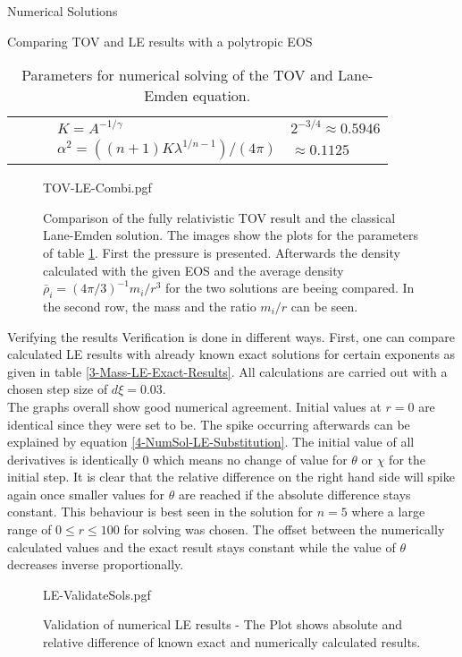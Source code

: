 \begin{section}{Numerical Solutions}
\begin{subsection}{Comparing TOV and LE results with a polytropic EOS}
\begin{table}[H]
\begin{tabular}{@{}llcll@{}}
		&&& $K=A^{-1/\gamma}$ & $2^{-3/4}\approx0.5946$\\
		&&& $\alpha^2=((n+1)K\lambda^{1/n-1})/(4\pi)$ & $\approx0.1125$\\
		\bottomrule
	\end{tabular}
	\caption[Numerical Parameters for TOV and Lane-Emden equation]{Parameters for numerical solving of the TOV and Lane-Emden equation.}
	\label{4-NumSol-TOVParameters}
\end{table}%
\begin{figure}[H]
	\centering
	{TOV-LE-Combi.pgf}
	\caption[Comparison TOV and LE equation]{Comparison of the fully relativistic TOV result and the classical Lane-Emden solution. The images show the plots for the parameters of table \ref{4-NumSol-TOVParameters}. First the pressure is presented. Afterwards the density calculated with the given EOS and the average density $\bar{\rho}_i=(4\pi/3)^{-1}m_i/r^3$ for the two solutions are beeing compared. In the second row, the mass and the ratio $m_i/r$ can be seen.}
	\label{4-NumSol-TOVEqEasyEOS}
\end{figure}
\end{subsection}
%
%
\begin{subsection}{Verifying the results}
\label{4-NumSol-Sec-Verifiying-the-results}
Verification is done in different ways. First, one can compare calculated LE results with already known exact  solutions for certain exponents as given in table \ref{3-Mass-LE-Exact-Results}. All calculations are carried out with a chosen step size of $d\xi=0.03$.\\
The graphs overall show good numerical agreement. Initial values at $r=0$ are identical since they were set to be. The spike occurring afterwards can be explained by equation \ref{4-NumSol-LE-Substitution}. The initial value of all derivatives is identically $0$ which means no change of value for $\theta$ or $\chi$ for the initial step. It is clear that the relative difference on the right hand side will spike again once smaller values for $\theta$ are reached if the absolute difference stays constant. This behaviour is best seen in the solution for $n=5$ where a large range of $0\leq r\leq100$ for solving was chosen. The offset between the numerically calculated values and the exact result stays constant while the value of $\theta$ decreases inverse proportionally.
\begin{figure}[H]
	\centering
	{LE-ValidateSols.pgf}
	\caption[Validation of numerical LE results]{Validation of numerical LE results - The Plot shows absolute and relative difference of known exact and numerically calculated results.}

\end{figure}
\end{subsection}
\end{section}
